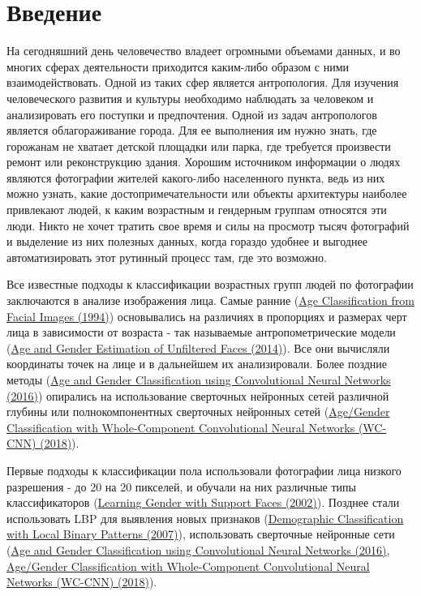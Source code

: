 \documentclass[a4paper,14pt]{extarticle}
\newcommand{\bibref}[3]{\hyperlink{#1}{#2 (#3)}} %
\begin{document}
    \section{Введение}

    \par На сегодняшний день человечество владеет огромными объемами данных, и во многих сферах деятельности приходится каким-либо образом с ними взаимодействовать. Одной из таких сфер является антропология. Для изучения человеческого развития и культуры необходимо наблюдать за человеком и анализировать его поступки и предпочтения. Одной из задач антропологов является облагораживание города. Для ее выполнения им нужно знать, где горожанам не хватает детской площадки или парка, где требуется произвести ремонт или реконструкцию здания. Хорошим источником информации о людях являются фотографии жителей какого-либо населенного пункта, ведь из них можно узнать, какие достопримечательности или объекты архитектуры наиболее привлекают людей, к каким возрастным и гендерным группам относятся эти люди. Никто не хочет тратить свое время и силы на просмотр тысяч фотографий и выделение из них полезных данных, когда гораздо удобнее и выгоднее автоматизировать этот рутинный процесс там, где это возможно.
    \par Все известные подходы к классификации возрастных групп людей по фотографии заключаются в анализе изображения лица. Самые ранние (\bibref{age1994}{Age Classification from Facial Images}{1994}) основывались на различиях в пропорциях и размерах черт лица в зависимости от возраста - так называемые антропометрические модели (\bibref{unfiltered}{Age and Gender Estimation of Unfiltered Faces}{2014}). Все они вычисляли координаты точек на лице и в дальнейшем их анализировали. Более поздние методы (\bibref{hassner}{Age and Gender Classification using Convolutional Neural Networks}{2016}) опирались на использование сверточных нейронных сетей различной глубины или полнокомпонентных сверточных нейронных сетей (\bibref{INDIA}{Age/Gender Classification with Whole-Component
    Convolutional Neural Networks (WC-CNN)}{2018}).
    \par Первые подходы к классификации пола использовали фотографии лица низкого разрешения - до 20 на 20 пикселей, и обучали на них различные типы классификаторов (\bibref{smoll}{Learning Gender with Support Faces}{2002}). Позднее стали использовать LBP для выявления новых признаков (\bibref{lbp_age}{Demographic Classification with Local Binary Patterns}{2007}), использовать сверточные нейронные сети (\bibref{hassner}{Age and Gender Classification using Convolutional Neural Networks}{2016}, \bibref{INDIA}{Age/Gender Classification with Whole-Component
    Convolutional Neural Networks (WC-CNN)}{2018}).
\end{document}
